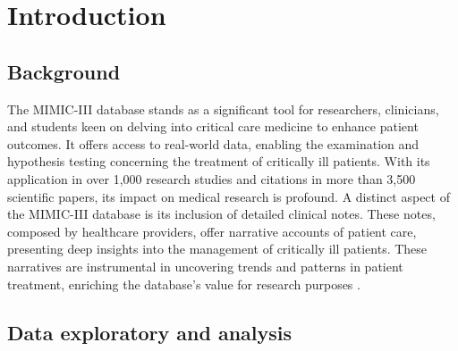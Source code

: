 \documentclass[journal,article,submit,pdftex,moreauthors]{Definitions/mdpi}
\begin{document}



\section{Introduction}\label{sec1}

\subsection{Background}\label{subsec1}
The MIMIC-III database stands as a significant tool for researchers, clinicians, and students keen on delving into critical care medicine to enhance patient outcomes. It offers access to real-world data, enabling the examination and hypothesis testing concerning the treatment of critically ill patients. With its application in over 1,000 research studies and citations in more than 3,500 scientific papers, its impact on medical research is profound. A distinct aspect of the MIMIC-III database is its inclusion of detailed clinical notes. These notes, composed by healthcare providers, offer narrative accounts of patient care, presenting deep insights into the management of critically ill patients. These narratives are instrumental in uncovering trends and patterns in patient treatment, enriching the database's value for research purposes \cite{ref-url2}.

\subsection{Data exploratory and analysis}\label{subsec2}
\end{document}

